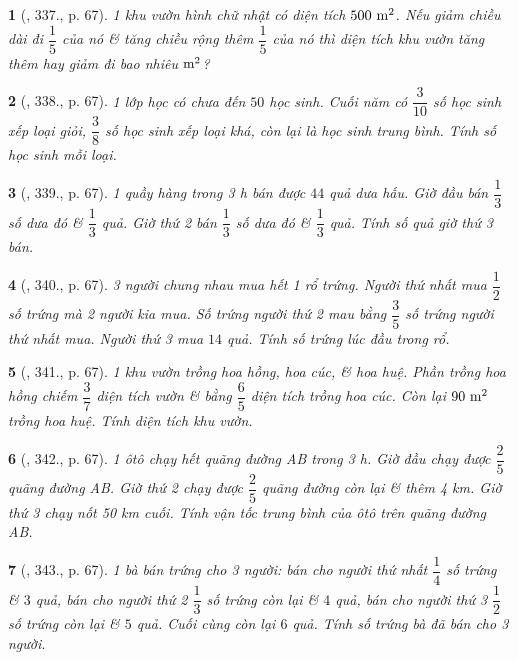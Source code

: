 \documentclass{article}
\newtheorem{baitoan}{}
\begin{document}
\begin{baitoan}[\cite{Tuyen_Toan_6}, 337., p. 67]
	1 khu vườn hình chữ nhật có diện tích $\rm500\ m^2$. Nếu giảm chiều dài đi $\dfrac{1}{5}$ của nó \& tăng chiều rộng thêm $\dfrac{1}{5}$ của nó thì diện tích khu vườn tăng thêm hay giảm đi bao nhiêu $\rm m^2$?
\end{baitoan}

\begin{baitoan}[\cite{Tuyen_Toan_6}, 338., p. 67]
	1 lớp học có chưa đến $50$ học sinh. Cuối năm có $\dfrac{3}{10}$ số học sinh xếp loại giỏi, $\dfrac{3}{8}$ số học sinh xếp loại khá, còn lại là học sinh trung bình. Tính số học sinh mỗi loại.
\end{baitoan}

\begin{baitoan}[\cite{Tuyen_Toan_6}, 339., p. 67]
	1 quầy hàng trong {\rm3 h} bán được $44$ quả dưa hấu. Giờ đầu bán $\dfrac{1}{3}$ số dưa đó \& $\dfrac{1}{3}$ quả. Giờ thứ 2 bán $\dfrac{1}{3}$ số dưa đó \& $\dfrac{1}{3}$ quả. Tính số quả giờ thứ 3 bán.
\end{baitoan}

\begin{baitoan}[\cite{Tuyen_Toan_6}, 340., p. 67]
	3 người chung nhau mua hết 1 rổ trứng. Người thứ nhất mua $\dfrac{1}{2}$ số trứng mà 2 người kia mua. Số trứng người thứ 2 mau bằng $\dfrac{3}{5}$ số trứng người thứ nhất mua. Người thứ 3 mua $14$ quả. Tính số trứng lúc đầu trong rổ.
\end{baitoan}

\begin{baitoan}[\cite{Tuyen_Toan_6}, 341., p. 67]
	1 khu vườn trồng hoa hồng, hoa cúc, \& hoa huệ. Phần trồng hoa hồng chiếm $\dfrac{3}{7}$ diện tích vườn \& bằng $\dfrac{6}{5}$ diện tích trồng hoa cúc. Còn lại $\rm90\ m^2$ trồng hoa huệ. Tính diện tích khu vườn.
\end{baitoan}

\begin{baitoan}[\cite{Tuyen_Toan_6}, 342., p. 67]
	1 ôtô chạy hết quãng đường AB trong {\rm3 h}. Giờ đầu chạy được $\dfrac{2}{5}$ quãng đường AB. Giờ thứ 2 chạy được $\dfrac{2}{5}$ quãng đường còn lại \& thêm {\rm4 km}. Giờ thứ 3 chạy nốt {\rm50 km} cuối. Tính vận tốc trung bình của ôtô trên quãng đường AB.
\end{baitoan}

\begin{baitoan}[\cite{Tuyen_Toan_6}, 343., p. 67]
	1 bà bán trứng cho 3 người: bán cho người thứ nhất $\dfrac{1}{4}$ số trứng \& $3$ quả, bán cho người thứ 2 $\dfrac{1}{3}$ số trứng còn lại \& $4$ quả, bán cho người thứ 3 $\dfrac{1}{2}$ số trứng còn lại \& $5$ quả. Cuối cùng còn lại $6$ quả. Tính số trứng bà đã bán cho 3 người.
\end{baitoan}
\end{document}
